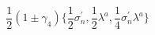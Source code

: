 \begin{equation}
\frac{1}{2} (1 \pm \gamma_{4}) \{ \frac{1}{2} \sigma_{n}^{'}, 
\frac{1}{2} \lambda^{a}, \frac{1}{4}  \sigma_{n}^{'} \lambda^{a} \} 
\end{equation}

